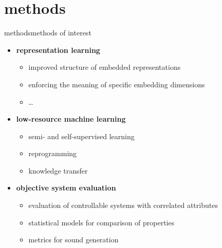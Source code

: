      \section[methods]{methods}
        \begin{frame}{methods}{methods of interest}
            \begin{itemize}
                \item   \textbf{representation learning}
                    \begin{itemize}
                        \item   improved structure of embedded representations \cite{seshadri_improving_2021, ma_representation_2022}
                        \item   enforcing the meaning of specific embedding dimensions \cite{pati_attribute-based_2020, pati_is_2021}
                        \item   \ldots
                    \end{itemize}
                 \bigskip
                 \item<2->  \textbf{low-resource machine learning}
                    \begin{itemize}
                        \item   semi- and self-supervised learning \cite{gururani_semi-supervised_2021, wu_labeled_2018}
                        \item   reprogramming \cite{chen_music_2023, hung_low-resource_2023}
                        \item   knowledge transfer \cite{hung_feature-informed_2022, ding_audio_2023, ding_embedding_2024}
                    \end{itemize}
                 \bigskip
                 \item<3->  \textbf{objective system evaluation}
                    \begin{itemize}
                        \item   evaluation of controllable systems with correlated attributes \cite{watcharasupat_evaluation_2021, watcharasupat_latte_2022}
                        \item   statistical models for comparison of properties \cite{yang_evaluation_2020}
                        \item   metrics for sound generation \cite{vinay_evaluating_2022}
                    \end{itemize}
            \end{itemize}
            \end{frame}
        

